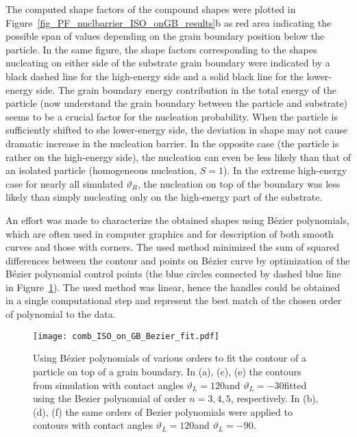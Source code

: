 The computed shape factors of the compound shapes were plotted in Figure~\ref{fig_PF_nuclbarrier_ISO_onGB_results}b as red area indicating the possible span of values depending on the grain boundary position below the particle. In the same figure, the shape factors corresponding to the shapes nucleating on either side of the substrate grain boundary were indicated by a black dashed line for the high-energy side and a solid black line for the lower-energy side. The grain boundary energy contribution in the total energy of the particle (now understand the grain boundary between the particle and substrate) seems to be a crucial factor for the nucleation probability. When the particle is sufficiently shifted to she lower-energy side, the deviation in shape may not cause dramatic increase in the nucleation barrier. In the opposite case (the particle is rather on the high-energy side), the nucleation can even be less likely than that of an isolated particle (homogeneous nucleation, $S=1$). In the extreme high-energy case for nearly all simulated $\vartheta_R$, the nucleation on top of the boundary was less likely than simply nucleating only on the high-energy part of the substrate. 

An effort was made to characterize the obtained shapes using Bézier polynomials, which are often used in computer graphics and for description of both smooth curves and those with corners. The used method minimized the sum of squared differences between the contour and points on Bézier curve by optimization of the Bézier polynomial control points (the blue circles connected by dashed blue line in Figure~\ref{fig_ISO_on_GB_Bezier_fit}). The used method was linear, hence the handles could be obtained in a single computational step and represent the best match of the chosen order of polynomial to the data.

\begin{figure}
	\centering
	\texttt{[image: comb\_ISO\_on\_GB\_Bezier\_fit.pdf]}
	\caption[Fit of the final PF contours of a particle on top of a grain boundary using Bézier polynomials]{Using Bézier polynomials of various orders to fit the contour of a particle on top of a grain boundary. In (a), (c), (e) the contours from simulation with contact angles $\vartheta_L=120$\textdegree and $\vartheta_L=-30$\textdegree fitted using the Bezier polynomial of order $n=3,4,5$, respectively. In (b), (d), (f) the same orders of Bezier polynomials were applied to contours with contact angles $\vartheta_L=120$\textdegree and $\vartheta_L=-90$\textdegree.}
	\label{fig_ISO_on_GB_Bezier_fit}
\end{figure}

